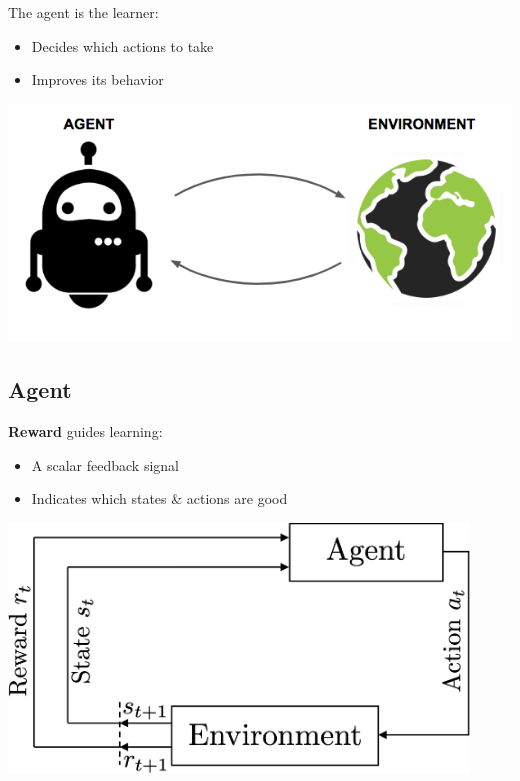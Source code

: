 \documentclass[
  letterpaper,
  DIV=11,
  numbers=noendperiod,
  oneside]{scrartcl}
\providecommand{\tightlist}{%
  \setlength{\itemsep}{0pt}\setlength{\parskip}{0pt}}\usepackage{longtable,booktabs,array}
\begin{document}
The agent is the learner:

\begin{itemize}
\tightlist
\item
  Decides which actions to take
\item
  Improves its behavior
\end{itemize}

\begin{center}
\includegraphics{figs/RL_illustration.png}
\end{center}


\subsection{Agent}\label{agent-1}

\textbf{Reward} guides learning:

\begin{itemize}
\tightlist
\item
  A scalar feedback signal
\item
  Indicates which states \& actions are good
\end{itemize}

\begin{center}
\includegraphics[width=\textwidth,height=2.60417in]{figs/RLSutton.png}
\end{center}
\end{document}
